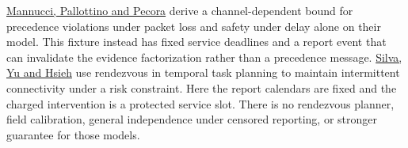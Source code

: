 \documentclass[11pt]{article}
\begin{document}
\href{https://www.centropiaggio.unipi.it/sites/default/files/provably_safe_multi_robot_coordination_with_unreliable_communication.pdf}{Mannucci, Pallottino and Pecora} derive a channel-dependent bound for precedence violations under packet loss and safety under delay alone on their model. This fixture instead has fixed service deadlines and a report event that can invalidate the evidence factorization rather than a precedence message. \href{https://doi.org/10.1007/s10514-025-10231-6}{Silva, Yu and Hsieh} use rendezvous in temporal task planning to maintain intermittent connectivity under a risk constraint. Here the report calendars are fixed and the charged intervention is a protected service slot. There is no rendezvous planner, field calibration, general independence under censored reporting, or stronger guarantee for those models.
\end{document}
